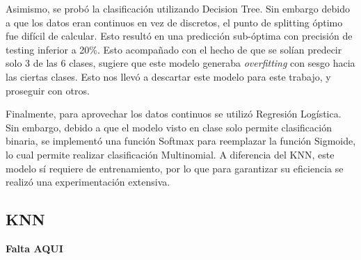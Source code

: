 \documentclass[conference]{IEEEtran}
\begin{document}
Asimismo, se probó la clasificación utilizando Decision Tree. Sin embargo debido a que los datos eran continuos en vez de discretos, el punto de splitting óptimo fue difícil de calcular. Esto resultó en una predicción sub-óptima con precisión de testing inferior a 20\%. Esto acompañado con el hecho de que se solían predecir solo 3 de las 6 clases, sugiere que este modelo generaba \textit{overfitting} con sesgo hacia las ciertas clases. Esto nos llevó a descartar este modelo para este trabajo, y proseguir con otros.

Finalmente, para aprovechar los datos continuos se utilizó Regresión Logística. Sin embargo, debido a que el modelo visto en clase solo permite clasificación binaria, se implementó una función Softmax para reemplazar la función Sigmoide, lo cual permite realizar clasificación Multinomial. A diferencia del KNN, este modelo sí requiere de entrenamiento, por lo que para garantizar su eficiencia se realizó una experimentación extensiva.

\subsection{KNN}
\textbf{Falta AQUI}
\end{document}
